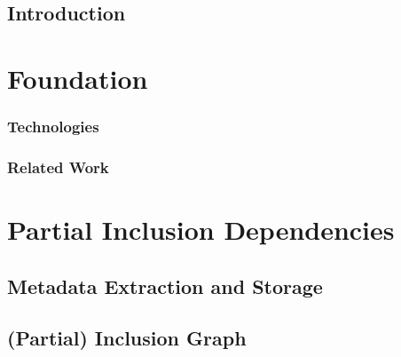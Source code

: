 \documentclass
[
    twoside,                 %
    openright,               %
    cleardoublepage = empty, %
    fontsize = 12 pt,        %
    american,                %
    captions = tableheading, %
    numbers = noenddot,      %
    footheight = 35 pt,      %
]
{scrbook}
\begin{document}
    \frontmatter
    

    \pagestyle{plain}

    

    

    

    \tableofcontents

    \pagestyle{headings}
    \mainmatter

    \chapter{Introduction}
    



    \part{Foundation}

    
        
    \section{Technologies}
    

    \section{Related Work}
    

    \part{Partial Inclusion Dependencies}
    
    \chapter{Metadata Extraction and Storage}

    \chapter{(Partial) Inclusion Graph}
    
\end{document}
